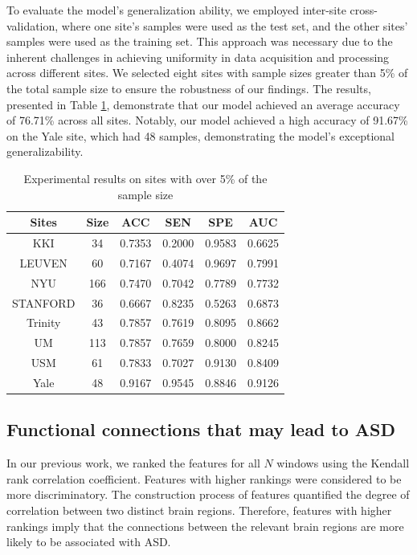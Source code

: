 \documentclass[a4paper]{cas-dc}
\begin{document}
To evaluate the model's generalization ability, we employed inter-site cross-validation, where one site's samples were used as the test set, and the other sites' samples were used as the training set. This approach was necessary due to the inherent challenges in achieving uniformity in data acquisition and processing across different sites.  We selected eight sites with sample sizes greater than 5\% of the total sample size to ensure the robustness of our findings. The results, presented in Table \ref{Table5}, demonstrate that our model achieved an average accuracy of 76.71\% across all sites. Notably, our model achieved a high accuracy of 91.67\% on the Yale site, which had 48 samples, demonstrating the model's exceptional generalizability.
\begin{table}[]
	\caption{Experimental results on sites with over 5\% of the sample size}\label{Table5}
	\begin{tabular*}{\tblwidth}{@{}cccccc@{}}
		\toprule
		\textbf{Sites}&\textbf{Size}& \textbf{ACC} & \textbf{SEN} & \textbf{SPE} & \textbf{AUC} \\ %
		\midrule
		KKI            & 34                   & 0.7353            & 0.2000               & 0.9583               & 0.6625       \\
		LEUVEN         & 60                   & 0.7167            & 0.4074               & 0.9697               & 0.7991       \\
		NYU            & 166                  & 0.7470            & 0.7042               & 0.7789               & 0.7732       \\
		STANFORD       & 36                   & 0.6667            & 0.8235               & 0.5263               & 0.6873       \\
		Trinity        & 43                   & 0.7857            & 0.7619               & 0.8095               & 0.8662       \\
		UM             & 113                  & 0.7857            & 0.7659               & 0.8000               & 0.8245       \\
		USM            & 61                   & 0.7833            & 0.7027               & 0.9130               & 0.8409       \\
		Yale           & 48                   & 0.9167            & 0.9545               & 0.8846               & 0.9126 \\
		\bottomrule
	\end{tabular*}
\end{table}
\subsection{Functional connections that may lead to ASD}
In our previous work, we ranked the features for all $N$ windows using the Kendall rank correlation coefficient. Features with higher rankings were considered to be more discriminatory. The construction process of features quantified the degree of correlation between two distinct brain regions. Therefore, features with higher rankings imply that the connections between the relevant brain regions are more likely to be associated with ASD.
\end{document}
